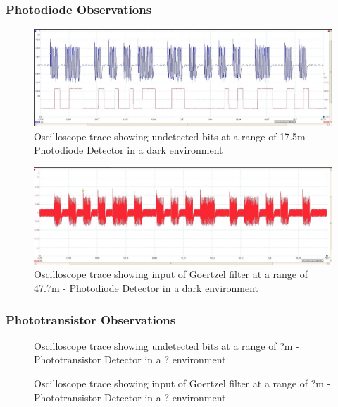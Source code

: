 \subsubsection{Photodiode Observations}
\begin{figure}[H]
	\centering
	\includegraphics[width=.9\textwidth]{figures/results/drak_system_test/photodiode1750cm_missed_bits.jpg}
	\caption{Oscilloscope trace showing undetected bits at a range of 17.5m - Photodiode Detector in a dark environment}
	\label{fig:photodiode_bit_error}
\end{figure}


\begin{figure}[H]
	\centering
	\includegraphics[width=.9\textwidth]{figures/results/drak_system_test/photodiode4770cm.jpg}
	\caption{Oscilloscope trace showing input of Goertzel filter at a range of 47.7m - Photodiode Detector in a dark environment}
	\label{fig:photodiode_range_4770cm}
\end{figure}

\subsubsection{Phototransistor Observations}

\begin{figure}[H]
	\centering
	\caption{Oscilloscope trace showing undetected bits at a range of ?m - Phototransistor Detector in a ? environment}
	\label{fig:phototransistor1}
\end{figure}


\begin{figure}[H]
	\centering
	\caption{Oscilloscope trace showing input of Goertzel filter at a range of ?m - Phototransistor Detector in a ? environment}
	\label{fig:phototransistor2}
\end{figure}



